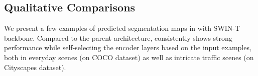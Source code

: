 \subsection{Qualitative Comparisons}

We present a few examples of predicted segmentation maps in  with SWIN-T \cite{liu2021swin} backbone. Compared to the parent architecture, \ours consistently shows strong performance while self-selecting the encoder layers based on the input examples, both in everyday scenes (on COCO dataset) as well as intricate traffic scenes (on Cityscapes dataset).